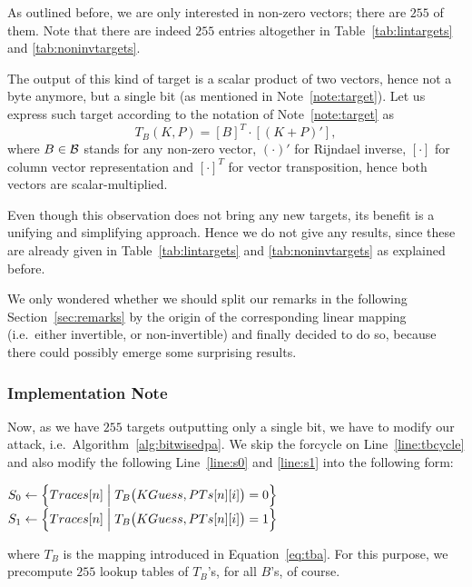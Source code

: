 As outlined before, we are only interested in non-zero vectors; there are $255$ of them. Note that there are indeed $255$ entries altogether in Table~\ref{tab:lintargets} and \ref{tab:noninvtargets}.

The output of this kind of target is a scalar product of two vectors, hence not a byte anymore, but a single bit (as mentioned in Note~\ref{note:target}). Let us express such target according to the notation of Note~\ref{note:target} as
\begin{equation}
\label{eq:tba}
	T_B(K,P) = [B]^T\cdot [(K+P)'] ,
\end{equation}
where $B\in\cal B$ stands for any non-zero vector, $(\cdot)'$ for Rijndael inverse, $[\cdot]$ for column vector representation and $[\cdot]^T$ for vector transposition, hence both vectors are scalar-multiplied.

Even though this observation does not bring any new targets, its benefit is a unifying and simplifying approach. Hence we do not give any results, since these are already given in Table~\ref{tab:lintargets} and \ref{tab:noninvtargets} as explained before.

We only wondered whether we should split our remarks in the following Section~\ref{sec:remarks} by the origin of the corresponding linear mapping (i.e.\ either invertible, or non-invertible) and finally decided to do so, because there could possibly emerge some surprising results.

\subsubsection{Implementation Note}
	
	Now, as we have $255$ targets outputting only a single bit, we have to modify our attack, i.e.\ Algorithm~\ref{alg:bitwisedpa}. We skip the forcycle on Line~\ref{line:tbcycle} and also modify the following Line~\ref{line:s0} and \ref{line:s1} into the following form:
	\begin{algorithmic}[1]
		\setcounter{ALG@line}{5}
		\State $S_0 \gets \Bigl\{ Traces[n] \Bigm| T_B\bigl(KGuess, PTs[n][i]\bigr) = 0 \Bigr\}$
		\State $S_1 \gets \Bigl\{ Traces[n] \Bigm| T_B\bigl(KGuess, PTs[n][i]\bigr) = 1 \Bigr\}$
	\end{algorithmic}
	where $T_B$ is the mapping introduced in Equation~\ref{eq:tba}. For this purpose, we precompute $255$ lookup tables of $T_B$'s, for all $B$'s, of course.
	
